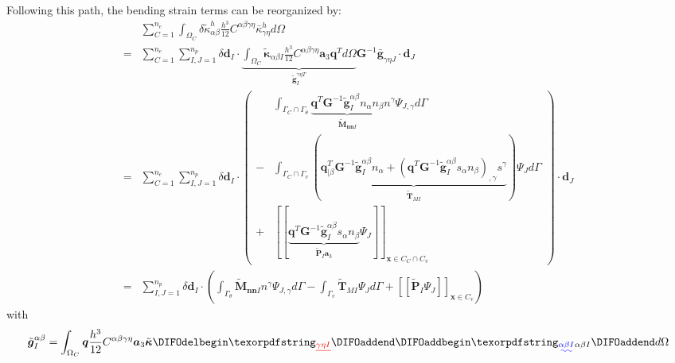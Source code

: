 Following this path, the bending strain terms can be reorganized by:
\begin{equation}
\begin{split}
&\sum_{C=1}^{n_e}\int_{\Omega_C} \delta \tilde \kappa_{\alpha\beta}^h \frac{h^3}{12}C^{\alpha\beta\gamma\eta}\bar \kappa^h_{\gamma\eta} d\Omega \\
        =&\sum_{C=1}^{n_e}\sum_{I,J=1}^{n_p}\delta \boldsymbol d_I \cdot \underbrace{\int_{\Omega_C} \tilde{\boldsymbol \kappa}_{\alpha\beta I} \frac{h^3}{12}C^{\alpha\beta\gamma\eta} \boldsymbol a_3 \boldsymbol q^T d\Omega}_{\tilde{\boldsymbol g}^{\gamma\eta T}_I} \boldsymbol G^{-1} \bar{\boldsymbol g}_{\gamma\eta J} \cdot \boldsymbol d_J \\
        =&\sum_{C=1}^{n_e}\sum_{I,J=1}^{n_p}\delta \boldsymbol d_I \cdot \left (
        \begin{split}
                &\int_{\Gamma_C\cap\Gamma_\theta} \underbrace{\boldsymbol q^T \boldsymbol G^{-1}\tilde{\boldsymbol g}^{\alpha\beta}_I n_\alpha n_\beta}_{\tilde{\boldsymbol M}_{\boldsymbol{nn} I}} n^\gamma\Psi_{J,\gamma} d\Gamma \\
                - &\int_{\Gamma_C\cap\Gamma_v} (\underbrace{\boldsymbol q^T_{\vert \beta} \boldsymbol G^{-1}\tilde{\boldsymbol g}^{\alpha\beta}_I n_\alpha + (\boldsymbol q^T \boldsymbol G^{-1}\tilde{\boldsymbol g}^{\alpha\beta}_I s_\alpha n_\beta)_{,\gamma}s^\gamma}_{\tilde{\boldsymbol T}_{M I}}) \Psi_J d\Gamma \\
                + &[[\underbrace{\boldsymbol q^T \boldsymbol G^{-1}\tilde{\boldsymbol g}^{\alpha\beta}_I s_\alpha n_\beta}_{\tilde{\boldsymbol P}_I \boldsymbol a_3} \Psi_J ]]_{\boldsymbol x\in C_C\cap C_v}
        \end{split}
       \right ) \cdot \boldsymbol d_J \\
       =&\sum_{I,J=1}^{n_p}\delta \boldsymbol d_I \cdot (
       \int_{\Gamma_\theta} \tilde{\boldsymbol M}_{\boldsymbol{nn} I} n^\gamma\Psi_{J,\gamma} d\Gamma
        - \int_{\Gamma_v} \tilde{\boldsymbol T}_{M I} \Psi_J d\Gamma
        + [[\tilde{\boldsymbol P}_I \Psi_J ]]_{\boldsymbol x\in C_v})
\end{split}
\end{equation}
with
\begin{equation}
\tilde{\boldsymbol g}^{\alpha\beta}_I = \int_{\Omega_C} \boldsymbol q \frac{h^3}{12}C^{\alpha\beta\gamma\eta} \boldsymbol a_3 \tilde{\boldsymbol \kappa}\DIFdelbegin \DIFdel{_{\gamma\eta I}}\DIFdelend \DIFaddbegin \DIFadd{_{\alpha\beta I}}\DIFaddend d\Omega
\end{equation}
